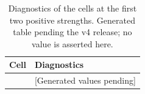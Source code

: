 \begin{table}[t]
\caption{Diagnostics of the cells at the first two positive strengths. Generated table pending the v4 release; no value is asserted here.}\label{tab:v4-slow}
\centering\begin{tabular}{ll}\hline
Cell & Diagnostics \\\hline
[Insert generated rows] & [Generated values pending] \\\hline
\end{tabular}
\end{table}
